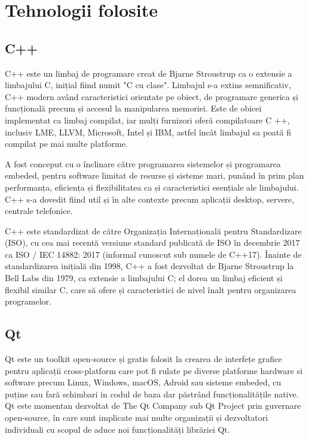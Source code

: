 \newpage
\section{Tehnologii folosite}
\subsection{C++}

C++ este un limbaj de programare creat de Bjarne Stroustrup ca o extensie a limbajului C, inițial fiind numit "C cu clase". 
Limbajul s-a extins semnificativ, C++ modern având caracteristici orientate pe obiect, de programare generica și funcțională 
precum și accesul la manipularea memoriei. Este de obicei implementat ca limbaj compilat, iar mulți furnizori oferă 
compilatoare C ++, inclusiv LME, LLVM, Microsoft, Intel și IBM, astfel încât limbajul sa poată fi compilat pe mai multe platforme.\newline 

A fost conceput cu o înclinare către programarea sistemelor și programarea embeded, pentru software limitat de resurse și sisteme mari, 
punând în prim plan performanța, eficiența și flexibilitatea ca și caracteristici esențiale ale limbajului. C++ s-a dovedit 
fiind util și în alte contexte precum aplicații desktop, servere, centrale telefonice.\newline

C++ este standardizat de către Organizația Internațională pentru Standardizare (ISO), cu cea mai recentă versiune standard 
publicată de ISO în decembrie 2017 ca ISO / IEC 14882: 2017 (informal cunoscut sub numele de C++17). Înainte de standardizarea 
inițială din 1998, C++ a fost dezvoltat de Bjarne Stroustrup la Bell Labs din 1979, ca extensie a 
limbajului C; el dorea un limbaj eficient și flexibil similar C, care să ofere și caracteristici de nivel înalt pentru organizarea 
programelor.\newline

\subsection{Qt}

Qt este un toolkit open-source și gratis folosit la crearea de interfețe grafice pentru aplicații cross-platform care 
pot fi rulate pe diverse platforme hardware si software precum Linux, Windows, macOS, Adroid sau sisteme embeded, 
cu puține sau fară schimbari in codul de baza dar păstrând funcționalitățile native. Qt este momentan dezvoltat 
de The Qt Company sub Qt Project prin guvernare open-source, în care sunt implicate mai multe organizații și dezvoltatori 
individuali cu scopul de aduce noi funcționalități librăriei Qt.\newline

